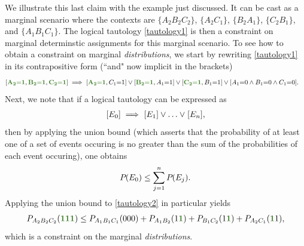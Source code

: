 We illustrate this last claim with the example just discussed.  It can be cast as a marginal scenario where the contexts are $\{A_2 B_2 C_2\}$, $\{A_2 C_1\}$, $\{B_2 A_1\}$, $\{C_2 B_1\}$, and  $\{A_1 B_1 C_1\}$.  The logical tautology \eqref{tautology1} is then a constraint on marginal determinstic  assignments for this marginal scenario.   To see how to obtain a constraint on marginal {\em distributions}, we start by rewriting \cref{tautology1} in its contrapositive form (``and" now implicit in the brackets)
\begin{align}\begin{split}\label{tautology2}
&[\mgreen{A_2 \eql 1} , \mgreen{B_2 \eql 1} , \mgreen{C_2 \eql 1}]  \implies [\mgreen{A_2 \eql 1}, C_1 \eql 1] \lor  [\mgreen{B_2 \eql 1}, A_1 \eql 1] \lor  [\mgreen{C_2 \eql 1}, B_1 \eql 1] \lor  [A_1 \eql 0 \land B_1 \eql 0 \land C_1 \eql 0].
\end{split}\end{align}
Next, we note that if a logical tautology can be expressed as
\begin{align}\label{eq:inference}
    {\operatorname{\mathsf{}}_{}}\lbrack E_0\rbrack \implies {\operatorname{\mathsf{}}_{}}\lbrack E_1\rbrack \lor \ldots \lor {\operatorname{\mathsf{}}_{}}\lbrack E_n\rbrack,
\end{align}
then by applying the union bound (which asserts that the probability of at least one of a set of events occuring is no greater than the sum of the probabilities of each event occuring), 
 one obtains
\begin{align}\label{eq:possinference}
{P_{}}\lparen E_0\rparen\leq \sum\limits_{j=1}^n{{P_{}}\lparen E_j\rparen}.
\end{align}
Applying the union bound to \cref{tautology2} in particular yields
\begin{align}\label{eq:F3rawweak}
P_{A_2 B_2 C_2}\parens{\mgreen{1} \mgreen{1} \mgreen{1}} \leq P_{A_1 B_1 C_1}\parens{0 0 0}+P_{A_1 B_2}\parens{1 \mgreen{1 }}+P_{ B_1 C_2}\parens{ 1 \mgreen{1}}+P_{A_2 C_1}\parens{\mgreen{1 } 1},
\end{align}
which is a constraint on the marginal {\em distributions}.
 

